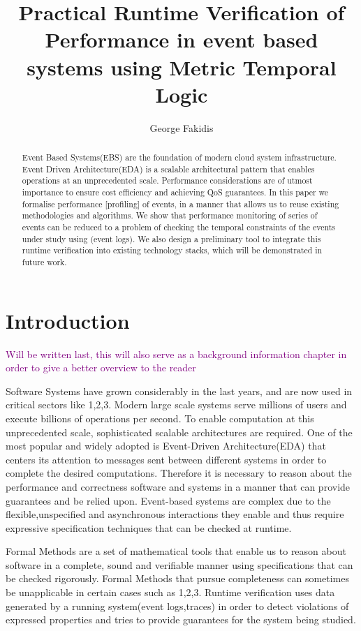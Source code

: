 \documentclass[twocolumn]{article}
\title{Practical Runtime Verification of Performance in event based systems using Metric Temporal Logic}
\author{George Fakidis}
\newcommand{\note}[1] {
	\textcolor{Purple}{#1}

}
\begin{document}
\maketitle
\begin{abstract}
	Event Based Systems(EBS) are the foundation of modern cloud system infrastructure. Event Driven Architecture(EDA) is a scalable architectural pattern that enables operations at an unprecedented scale. Performance considerations are of utmost importance to ensure cost efficiency and achieving QoS guarantees. In this paper we formalise performance [profiling] of events, in a manner that allows us to reuse existing methodologies and algorithms. We show that performance monitoring of series of events can be reduced to a problem of checking the temporal constraints of the events under study using (event logs). We also design a preliminary tool to integrate this runtime verification into existing technology stacks, which will be demonstrated in future work.
\end{abstract}


\section{Introduction}

\note{Will be written last, this will also serve as a background information chapter in order to give a better overview to the reader}

Software Systems have grown considerably in the last years, and are now used in critical sectors like 1,2,3.
Modern large scale systems serve millions of users and execute billions of operations per second.
To enable computation at this unprecedented scale, sophisticated scalable architectures are required.
One of the most popular and widely adopted is Event-Driven Architecture(EDA) that centers its attention to messages sent between different systems in order to complete the desired computations.
Therefore it is necessary to reason about the performance and correctness software and systems in a manner that can provide guarantees and be relied upon. Event-based systems are complex due to the flexible,unspecified and asynchronous interactions they enable and thus require expressive specification techniques that can be checked at runtime.
\par
Formal Methods are a set of mathematical tools that enable us to reason about software in a complete, sound and verifiable manner using specifications that can be checked rigorously. Formal Methods that pursue completeness can sometimes be unapplicable in certain cases such as 1,2,3. Runtime verification uses data generated by a running system(event logs,traces) in order to detect violations of expressed properties and tries to provide guarantees for the system being studied.
\end{document}
